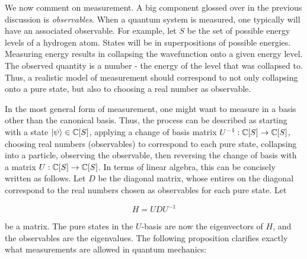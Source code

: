 \documentclass{article}
\theoremstyle{definition}
\numberwithin{figure}{section}
\begin{document}
We now comment on measurement. A big component glossed over in the previous discussion is \textit{observables}. When a quantum system is measured, one typically will have an associated observable. For example, let $S$ be the set of possible energy levels of a hydrogen atom. States will be in superpositions of possible energies. Measuring energy results in collapsing the wavefunction onto a given energy level. The observed quantity is a number - the energy of the level that was collapsed to. Thus, a realistic model of measurement should correspond to not only collapsing onto a pure state, but also to choosing a real number as observable.

In the most general form of measurement, one might want to measure in a basis other than the canonical basis. Thus, the process can be described as starting with a state $\left|\psi\right> \in \mathbb{C}[S]$, applying a change of basis matrix $U^{-1}: \mathbb{C}[S]\to \mathbb{C}[S]$, choosing real numbers (observables) to correspond to each pure state, collapsing into a particle, observing the observable, then reversing the change of basis with a matrix $U: \mathbb{C}[S]\to \mathbb{C}[S]$. In terms of linear algebra, this can be concisely written as follows. Let $D$ be the diagonal matrix, whose entires on the diagonal correspond to the real numbers chosen as observables for each pure state. Let

$$H=UDU^{-1}$$

be a matrix. The pure states in the $U$-basis are now the eigenvectors of $H$, and the observables are the eigenvalues. The following proposition clarifies exactly what measurements are allowed in quantum mechanics:
\end{document}
